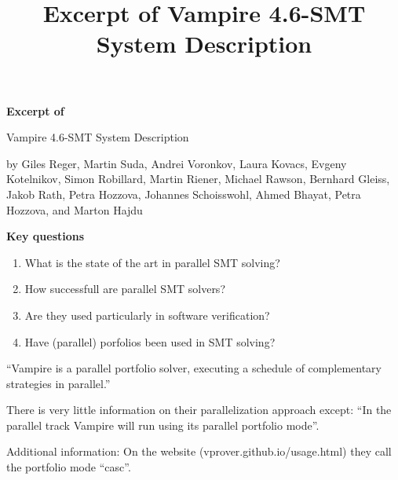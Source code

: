 \documentclass{scrartcl}
\title{Excerpt of Vampire 4.6-SMT System Description}
\begin{document}
\begin{center}
    \Large{\textbf{Excerpt of}}

    \LARGE{Vampire 4.6-SMT System Description}

    \large{by Giles Reger, Martin Suda, Andrei Voronkov, Laura Kovacs,
        Evgeny Kotelnikov, Simon Robillard, Martin Riener, Michael Rawson,
        Bernhard Gleiss, Jakob Rath, Petra Hozzova, Johannes Schoisswohl,
        Ahmed Bhayat, Petra Hozzova, and Marton Hajdu
    }
\end{center}

\vspace{1cm}

\begin{addmargin}[0.2\linewidth]{0.2\linewidth}
    \begin{center}
        \textbf{Key questions}
    \end{center}
    \begin{enumerate}[i]
        \item What is the state of the art in parallel SMT solving?
        \item How successfull are parallel SMT solvers?
        \item Are they used particularly in software verification?
        \item Have (parallel) porfolios been used in SMT solving?
    \end{enumerate}
\end{addmargin}

\vspace{1cm}

\enquote{Vampire is a parallel portfolio solver, executing a schedule of complementary
strategies in parallel.}

There is very little information on their parallelization approach except:
\enquote{In the parallel track Vampire will run using its parallel portfolio mode}.

Additional information:
On the website (vprover.github.io/usage.html) they call the portfolio mode \enquote{casc}.
\end{document}
